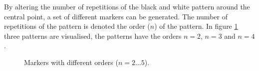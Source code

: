 \documentclass{article}
\begin{document}
By altering the number of repetitions of the black and white pattern around the central point, 
a set of different markers can be generated. 
The number of repetitions of the pattern is denoted the order ($n$) of the pattern. 
In figure \ref{figPlainMarkers} three patterns are visualised, the patterns have the orders 
$n = 2$, $n = 3$ and $n = 4$. 
\begin{figure} 
\newcommand{\steplength}{30} 
\newcommand{\archlength}{1.6cm} 
\newcommand{\drawarch}[1]{\draw[color=black,fill=black] (2*#1:\archlength) arc(2*#1:2*#1+\steplength:\archlength) 
-- (0, 0) -- (2*#1:\archlength); } 
\newcommand{\drawdot}{} 
\newcommand{\draworder}[1]{\draw (0, -2.2) node {n = #1};} 
\renewcommand{\archlength}{1cm} 
\caption{Markers with different orders ($n = 2 \ldots 5$).} 
\label{figPlainMarkers} 
\end{figure} 
\end{document}
